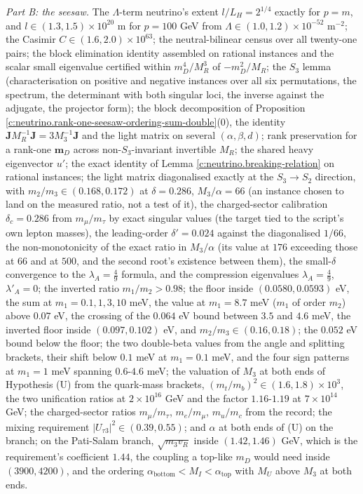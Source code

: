 \documentclass[11pt]{article}
\theoremstyle{definition}
\theoremstyle{plain}
\providecommand{\J}{}\renewcommand{\J}{\mathbf{J}}
\providecommand{\LH}{}\renewcommand{\LH}{L_{H}}
\providecommand{\mD}{}\renewcommand{\mD}{\mathbf{m}_{D}}
\begin{document}
\emph{Part B: the seesaw.} The $\Lambda$-term neutrino's extent $l/\LH = 2^{1/4}$ exactly for $p = m$, and $l \in (1.3, 1.5) \times 10^{20}$ m for $p = 100$ GeV from $\Lambda \in (1.0, 1.2) \times 10^{-52}$ m$^{-2}$; the Casimir $C \in (1.6, 2.0) \times 10^{63}$; the neutral-bilinear census over all twenty-one pairs; the block elimination identity assembled on rational instances and the scalar small eigenvalue certified within $m_{D}^{4}/M_{R}^{3}$ of $-m_{D}^{2}/M_{R}$; the $S_{3}$ lemma (characterisation on positive and negative instances over all six permutations, the spectrum, the determinant with both singular loci, the inverse against the adjugate, the projector form); the block decomposition of Proposition \ref{c:neutrino.rank-one-seesaw-ordering-sum-double}(0), the identity $\J M_{R}^{-1}\J = 3M_{3}^{-1}\J$ and the light matrix on several $(\alpha, \beta, d)$; rank preservation for a rank-one $\mD$ across non-$S_{3}$-invariant invertible $M_{R}$; the shared heavy eigenvector $u'$; the exact identity of Lemma \ref{c:neutrino.breaking-relation} on rational instances; the light matrix diagonalised exactly at the $S_{3} \to S_{2}$ direction, with $m_{2}/m_{3} \in (0.168, 0.172)$ at $\delta = 0.286$, $M_{3}/\alpha = 66$ (an instance chosen to land on the measured ratio, not a test of it), the charged-sector calibration $\delta_{c} = 0.286$ from $m_{\mu}/m_{\tau}$ by exact singular values (the target tied to the script's own lepton masses), the leading-order $\delta' = 0.024$ against the diagonalised $1/66$, the non-monotonicity of the exact ratio in $M_{3}/\alpha$ (its value at $176$ exceeding those at $66$ and at $500$, and the second root's existence between them), the small-$\delta$ convergence to the $\lambda_{A} = \tfrac49$ formula, and the compression eigenvalues $\lambda_{A} = \tfrac49$, $\lambda'_{A} = 0$; the inverted ratio $m_{1}/m_{2} > 0.98$; the floor inside $(0.0580, 0.0593)$ eV, the sum at $m_{1} = 0.1, 1, 3, 10$ meV, the value at $m_{1} = 8.7$ meV ($m_{1}$ of order $m_{2}$) above $0.07$ eV, the crossing of the $0.064$ eV bound between $3.5$ and $4.6$ meV, the inverted floor inside $(0.097, 0.102)$ eV, and $m_{2}/m_{3} \in (0.16, 0.18)$; the $0.052$ eV bound below the floor; the two double-beta values from the angle and splitting brackets, their shift below $0.1$ meV at $m_{1} = 0.1$ meV, and the four sign patterns at $m_{1} = 1$ meV spanning $0.6$-$4.6$ meV; the valuation of $M_{3}$ at both ends of Hypothesis (U) from the quark-mass brackets, $(m_{t}/m_{b})^{2} \in (1.6, 1.8) \times 10^{3}$, the two unification ratios at $2 \times 10^{16}$ GeV and the factor $1.16$-$1.19$ at $7 \times 10^{14}$ GeV; the charged-sector ratios $m_{\mu}/m_{\tau}$, $m_{e}/m_{\mu}$, $m_{u}/m_{c}$ from the record; the mixing requirement $|U_{\tau 3}|^{2} \in (0.39, 0.55)$; and $\alpha$ at both ends of (U) on the branch; on the Pati-Salam branch, $\sqrt{m_{3}v_{R}}$ inside $(1.42, 1.46)$ GeV, which is the requirement's coefficient $1.44$, the coupling a top-like $m_{D}$ would need inside $(3900, 4200)$, and the ordering $\alpha_{\mathrm{bottom}} < M_{I} < \alpha_{\mathrm{top}}$ with $M_{U}$ above $M_{3}$ at both ends.
\end{document}

